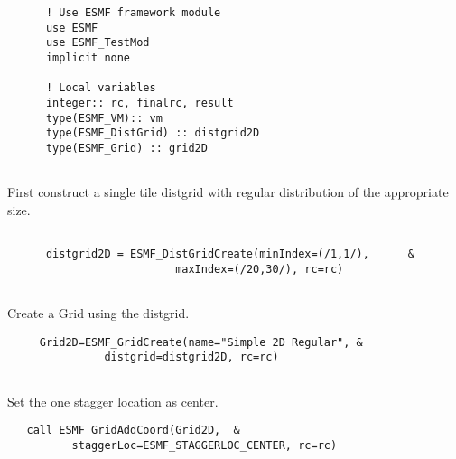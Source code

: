  \begin{verbatim}
      ! Use ESMF framework module
      use ESMF
      use ESMF_TestMod
      implicit none

      ! Local variables  
      integer:: rc, finalrc, result
      type(ESMF_VM):: vm
      type(ESMF_DistGrid) :: distgrid2D
      type(ESMF_Grid) :: grid2D
 
\end{verbatim}
 

   First construct a single tile distgrid with regular distribution of the
   appropriate size. 

 \begin{verbatim}

      distgrid2D = ESMF_DistGridCreate(minIndex=(/1,1/),      &
                          maxIndex=(/20,30/), rc=rc)  
 
\end{verbatim}
 

      Create a Grid using the distgrid.  

 \begin{verbatim}
     Grid2D=ESMF_GridCreate(name="Simple 2D Regular", &
               distgrid=distgrid2D, rc=rc)
 
\end{verbatim}
 

   Set the one stagger location as center.  

 \begin{verbatim}
   call ESMF_GridAddCoord(Grid2D,  &
          staggerLoc=ESMF_STAGGERLOC_CENTER, rc=rc)
 
\end{verbatim}

\setlength{\parskip}{\oldparskip}
\setlength{\parindent}{\oldparindent}
\setlength{\baselineskip}{\oldbaselineskip}
